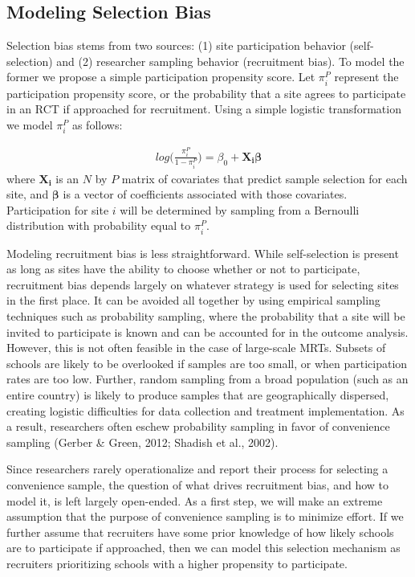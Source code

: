 \documentclass[man,floatsintext]{apa6}
\begin{document}
\hypertarget{modeling-selection-bias}{%
\subsection{Modeling Selection Bias}\label{modeling-selection-bias}}

Selection bias stems from two sources: (1) site participation behavior (self-selection) and (2) researcher sampling behavior (recruitment bias). To model the former we propose a simple participation propensity score. Let \(\pi^P_i\) represent the participation propensity score, or the probability that a site agrees to participate in an RCT if approached for recruitment. Using a simple logistic transformation we model \(\pi^P_i\) as follows:

\begin{align} \label{eq:RGM}
log\bigg(\frac{\pi^P_i}{1 - \pi^P_i}\bigg) = \beta_0 + \boldsymbol{X_i \beta}
\end{align}
where \(\boldsymbol{X_i}\) is an \(N\) by \(P\) matrix of covariates that predict sample selection for each site, and \(\boldsymbol{\beta}\) is a vector of coefficients associated with those covariates. Participation for site \(i\) will be determined by sampling from a Bernoulli distribution with probability equal to \(\pi^P_i\).

Modeling recruitment bias is less straightforward. While self-selection is present as long as sites have the ability to choose whether or not to participate, recruitment bias depends largely on whatever strategy is used for selecting sites in the first place. It can be avoided all together by using empirical sampling techniques such as probability sampling, where the probability that a site will be invited to participate is known and can be accounted for in the outcome analysis. However, this is not often feasible in the case of large-scale MRTs. Subsets of schools are likely to be overlooked if samples are too small, or when participation rates are too low. Further, random sampling from a broad population (such as an entire country) is likely to produce samples that are geographically dispersed, creating logistic difficulties for data collection and treatment implementation. As a result, researchers often eschew probability sampling in favor of convenience sampling (Gerber \& Green, 2012; Shadish et al., 2002).

Since researchers rarely operationalize and report their process for selecting a convenience sample, the question of what drives recruitment bias, and how to model it, is left largely open-ended. As a first step, we will make an extreme assumption that the purpose of convenience sampling is to minimize effort. If we further assume that recruiters have some prior knowledge of how likely schools are to participate if approached, then we can model this selection mechanism as recruiters prioritizing schools with a higher propensity to participate.
\end{document}
